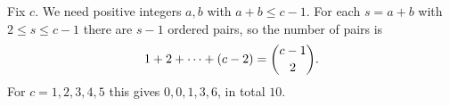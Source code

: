 Fix $c$. We need positive integers $a,b$ with $a+b\le c-1$. For each $s=a+b$ with $2\le s\le c-1$ there are $s-1$ ordered pairs, so the number of pairs is
\[
1+2+\dots+(c-2)=\dbinom{c-1}{2}.
\]
For $c=1,2,3,4,5$ this gives $0,0,1,3,6$, in total $\boxed{10}$.
